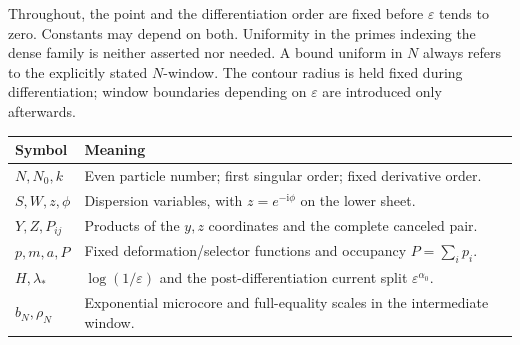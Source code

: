 \documentclass[11pt]{article}
\numberwithin{equation}{section}
\theoremstyle{definition}
\newcommand{\ii}{\mathrm i}
\newcommand{\eps}{\varepsilon}
\begin{document}
Throughout, the point and the differentiation order are fixed before
\(\eps\) tends to zero. Constants may depend on both. Uniformity in
the primes indexing the dense family is neither asserted nor needed.
A bound uniform in \(N\) always refers to the explicitly stated
\(N\)-window. The contour radius is held fixed during differentiation;
window boundaries depending on \(\eps\) are introduced only afterwards.

\begin{center}
\begin{tabular}{p{}p{}}
\toprule
Symbol & Meaning\\
\midrule
\(N,N_0,k\) & Even particle number; first singular order; fixed derivative order.\\
\(S,W,z,\phi\) & Dispersion variables, with \(z=e^{-\ii\phi}\) on the lower sheet.\\
\(Y,Z,P_{ij}\) & Products of the \(y,z\) coordinates and the complete canceled pair.\\
\(p,m,a,P\) & Fixed deformation/selector functions and occupancy \(P=\sum_i p_i\).\\
\(H,\lambda_*\) & \(\log(1/\eps)\) and the post-differentiation current split \(\eps^{\alpha_0}\).\\
\(b_N,\rho_N\) & Exponential microcore and full-equality scales in the intermediate window.\\
\bottomrule
\end{tabular}
\end{center}


\tableofcontents

\end{document}
